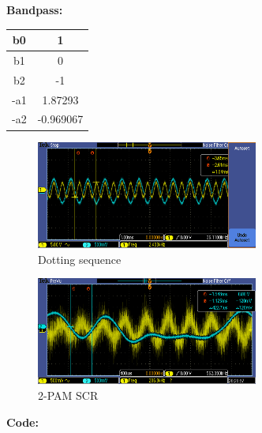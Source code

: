 \documentclass{article}
\begin{document}
\textbf{Bandpass:}

\begin{center}
\begin{tabular}{c|c}
b0	&	 1				\\ \hline
b1	&  0				\\ \hline
b2	& -1				\\ \hline
-a1	&	 1.87293\\ \hline
-a2	&	-0.969067\\ \hline
\end{tabular}
\end{center}

\begin{figure}[h]
  \begin{center}
    \includegraphics[width=0.65\textwidth]{img/dotting_sequence_SCR.png}
    \caption{Dotting sequence}
  \end{center}
\end{figure}

\begin{figure}[h]
  \begin{center}
    \includegraphics[width=0.65\textwidth]{img/2PAM_SCR.png}
    \caption{2-PAM SCR}
  \end{center}
\end{figure}

\pagebreak
\textbf{Code:}
\end{document}
